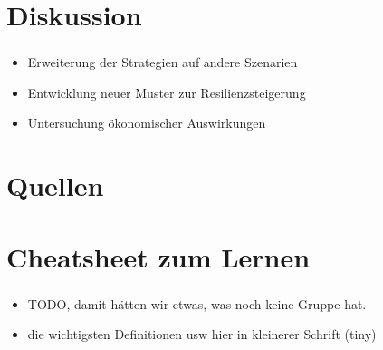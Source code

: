 \section{Diskussion}

\begin{frame}
    \frametitle{\insertsection}
    \framesubtitle{\insertsubsection}

    \begin{itemize}
        \item Erweiterung der Strategien auf andere Szenarien
        \item Entwicklung neuer Muster zur Resilienzsteigerung
        \item Untersuchung ökonomischer Auswirkungen
    \end{itemize}
\end{frame}

\section{Quellen}
\begin{frame}[allowframebreaks]{\insertsection} %

\end{frame}

\section{Cheatsheet zum Lernen}

\begin{frame}
\frametitle{\insertsection}
\framesubtitle{\insertsubsection}

\begin{itemize}
    \item TODO, damit hätten wir etwas, was noch keine Gruppe hat.
    \item die wichtigsten Definitionen usw hier in kleinerer Schrift (tiny)
\end{itemize}
\end{frame}

